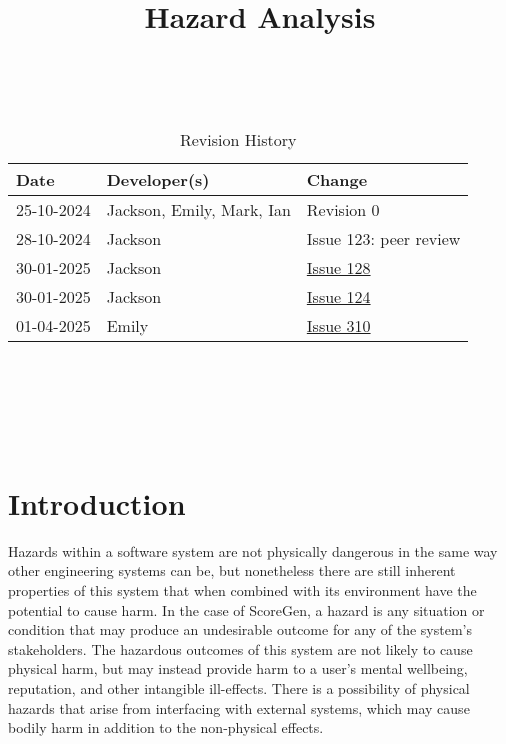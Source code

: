 \documentclass{article}
\title{Hazard Analysis\\\progname}
\author{\authname}
\date{}
\begin{document}
\maketitle
\thispagestyle{empty}

~\newpage


\begin{table}[hp]
\caption{Revision History} \label{TblRevisionHistory}
\begin{tabularx}{\textwidth}{llX}
\toprule
\textbf{Date} & \textbf{Developer(s)} & \textbf{Change}\\
\midrule
25-10-2024 & Jackson, Emily, Mark, Ian & Revision 0\\
28-10-2024 & Jackson & Issue 123: peer review\\
30-01-2025 & Jackson & \href{https://github.com/emilyperica/ScoreGen/issues/128}{Issue 128}\\
30-01-2025 & Jackson & \href{https://github.com/emilyperica/ScoreGen/issues/124}{Issue 124}\\
01-04-2025 & Emily & \href{https://github.com/emilyperica/ScoreGen/issues/310}{Issue 310}\\
\bottomrule
\end{tabularx}
\end{table}

~\newpage

\tableofcontents

~\newpage

\listoftables

~\newpage


\section{Introduction}

Hazards within a software system are not physically dangerous in the same way other engineering systems can be, 
but nonetheless there are still inherent properties of this system that when combined with its environment have 
the potential to cause harm. In the case of ScoreGen, a hazard is any situation or condition that may produce an 
undesirable outcome for any of the system’s stakeholders. The hazardous outcomes of this system are not likely to 
cause physical harm, but may instead provide harm to a user’s mental wellbeing, reputation, and other intangible 
ill-effects. There is a possibility of physical hazards that arise from interfacing with external systems, which 
may cause bodily harm in addition to the non-physical effects.
\end{document}
